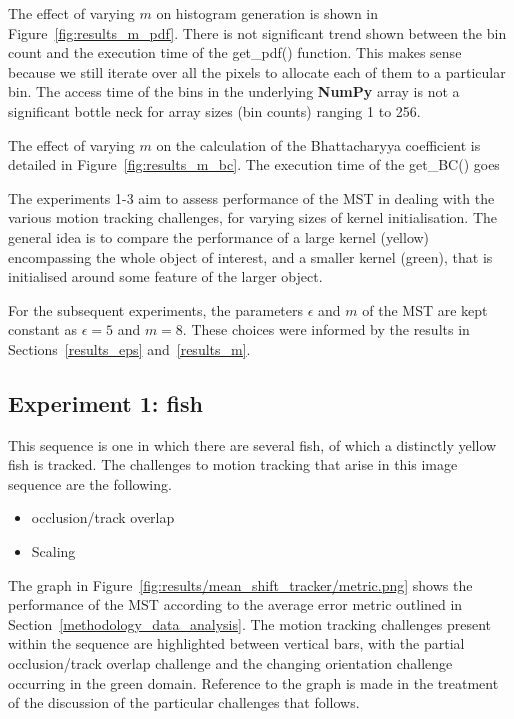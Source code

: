 The effect of varying $m$ on histogram generation is shown in
Figure~\ref{fig:results_m_pdf}. There is not significant trend shown between the
bin count and the execution time of the get\_pdf() function. This makes sense
because we still iterate over all the pixels to allocate each of them to a
particular bin. The access time of the bins in the underlying \textbf{NumPy} array is not
a significant bottle neck for array sizes (bin counts) ranging 1 to 256.

The effect of varying $m$ on the calculation of the Bhattacharyya coefficient is
detailed in Figure~\ref{fig:results_m_bc}. The execution time of the get\_BC() goes  



The experiments 1-3 aim to assess performance of the MST in dealing with the
various motion tracking challenges, for varying sizes of kernel initialisation.
The general idea is to compare the performance of a large kernel (yellow)
encompassing the whole object of interest, and a smaller kernel (green), that is
initialised around some feature of the larger object. 

For the subsequent experiments, the parameters $\epsilon$ and $m$ of the MST are
kept constant as $\epsilon=5$ and $m=8$. These choices were informed by the results in
Sections~\ref{results_eps} and~\ref{results_m}. 

\subsection{Experiment 1: fish}
This sequence is one in which there are several fish, of which a distinctly yellow fish is
tracked. The challenges to motion tracking that arise in this image sequence are the following.
\begin{itemize}
    \item occlusion/track overlap
    \item Scaling 
\end{itemize}

The graph in Figure~\ref{fig:results/mean_shift_tracker/metric.png} shows the
performance of the MST according to the average error metric outlined in
Section~\ref{methodology_data_analysis}. 
The motion tracking challenges present within the sequence are highlighted
between vertical bars, with the partial occlusion/track overlap challenge and the changing orientation challenge occurring in the green domain.
Reference to the graph is made in the treatment of the discussion of the
particular challenges that follows.


